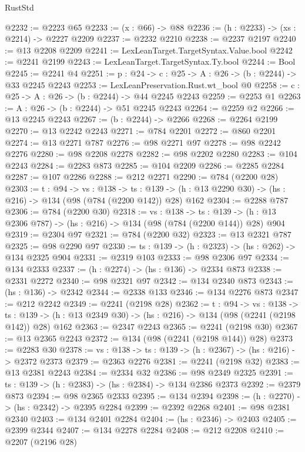 \begin{lexlean}{RustStd}
\begin{coremodule}
{\begin{coremodule}
{{{{{{{{{{@2232 := @2223 @65
@2233 := (x : @66) -> @88
@2236 := (h : @2233) -> (xs : @2214) -> @2227 @2209
@2237 := @2232 @2210
@2238 := @2237 @2197
@2240 := @13 @2208 @2209
@2241 := LexLeanTarget.TargetSyntax.Value.bool
@2242 := @2241 @2199
@2243 := LexLeanTarget.TargetSyntax.Ty.bool
@2244 := Bool
@2245 := @2241 @4
@2251 := {p : @24} -> {c : @25} -> {A : @26} -> (b : @2244) -> @33 @2245 @2243
@2253 := LexLeanPreservation.Rust.wt_bool @0
@2258 := {c : @25} -> {A : @26} -> (b : @2244) -> @44 @2245 @2243
@2259 := @2253 @1
@2263 := {A : @26} -> (b : @2244) -> @51 @2245 @2243
@2264 := @2259 @2
@2266 := @13 @2245 @2243
@2267 := (b : @2244) -> @2266
@2268 := @2264 @2199
@2270 := @13 @2242 @2243
@2271 := @784 @2201
@2272 := @860 @2201
@2274 := @13 @2271 @787
@2276 := @98 @2271 @97
@2278 := @98 @2242 @2276
@2280 := @98 @2208 @2278
@2282 := @98 @2202 @2280
@2283 := @104 @2243
@2284 := @2283 @873
@2285 := @104 @2209
@2286 := @2285 @2284
@2287 := @107 @2286
@2288 := @212 @2271
@2290 := @784 (@2200 @28)
@2303 := {t : @94} ->
  {vs : @138} ->
  {ts : @139} -> (h : @13 @2290 @30) -> (hs : @216) -> @134 (@98 (@784 (@2200 @142)) @28) @162
@2304 := @2288 @787
@2306 := @784 (@2200 @30)
@2318 := {vs : @138} ->
  {ts : @139} -> (h : @13 @2306 @787) -> (hs : @216) -> @134 (@98 (@784 (@2200 @144)) @28) @904
@2319 := @2304 @97
@2321 := @784 (@2200 @32)
@2323 := @13 @2321 @787
@2325 := @98 @2290 @97
@2330 := {ts : @139} -> (h : @2323) -> (hs : @262) -> @134 @2325 @904
@2331 := @2319 @103
@2333 := @98 @2306 @97
@2334 := @134 @2333
@2337 := (h : @2274) -> (hs : @136) -> @2334 @873
@2338 := @2331 @2272
@2340 := @98 @2321 @97
@2342 := @134 @2340 @873
@2343 := (hs : @136) -> @2342
@2344 := @2338 @133
@2346 := @134 @2276 @873
@2347 := @212 @2242
@2349 := @2241 (@2198 @28)
@2362 := {t : @94} ->
  {vs : @138} ->
  {ts : @139} -> (h : @13 @2349 @30) -> (hs : @216) -> @134 (@98 (@2241 (@2198 @142)) @28) @162
@2363 := @2347 @2243
@2365 := @2241 (@2198 @30)
@2367 := @13 @2365 @2243
@2372 := @134 (@98 (@2241 (@2198 @144)) @28)
@2373 := @2283 @30
@2378 := {vs : @138} -> {ts : @139} -> (h : @2367) -> (hs : @216) -> @2372 @2373
@2379 := @2363 @2276
@2381 := @2241 (@2198 @32)
@2383 := @13 @2381 @2243
@2384 := @2334 @32
@2386 := @98 @2349 @2325
@2391 := {ts : @139} -> (h : @2383) -> (hs : @2384) -> @134 @2386 @2373
@2392 := @2379 @873
@2394 := @98 @2365 @2333
@2395 := @134 @2394
@2398 := (h : @2270) -> (hs : @2342) -> @2395 @2284
@2399 := @2392 @2268
@2401 := @98 @2381 @2340
@2403 := @134 @2401 @2284
@2404 := (hs : @2346) -> @2403
@2405 := @2399 @2344
@2407 := @134 @2278 @2284
@2408 := @212 @2208
@2410 := @2207 (@2196 @28)
}}}}}}}}}}
\end{coremodule}}
\end{coremodule}
\end{lexlean}
